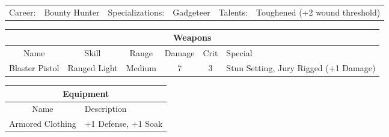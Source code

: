\documentclass[letterpaper]{article}
\begin{document}
\begin{center}
\begin{tabularx}{0.8\textwidth}{l l | l l | l X}
    Career: & Bounty Hunter & Specializations: & Gadgeteer & Talents: & Toughened (+2 wound threshold)
\end{tabularx}
\end{center}

\begin{center}
\begin{tabularx}{0.8\textwidth}{| c | c | c | c | c | X |}
    \multicolumn{6}{c}{Weapons} \\ \hline
    Name & Skill & Range & Damage & Crit & Special \\ \hline
    Blaster Pistol & Ranged Light & Medium & 7 & 3 & Stun Setting, Jury Rigged (+1 Damage) \\
    \hline
\end{tabularx}
\end{center}

\begin{center}
\begin{tabularx}{0.8\textwidth}{| c | X |}
    \multicolumn{2}{c}{Equipment} \\ \hline
    Name & Description \\ \hline
    Armored Clothing & +1 Defense, +1 Soak \\
    \hline
\end{tabularx}
\end{center}
\end{document}
